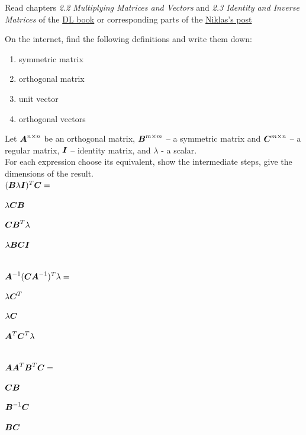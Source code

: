\begin{exercise}

Read chapters \textit{2.2 Multiplying Matrices and Vectors} and \textit{2.3 Identity and Inverse Matrices} of the \href{https://www.deeplearningbook.org/contents/linear_algebra.html}{DL book} or corresponding parts of the \href{https://towardsdatascience.com/linear-algebra-for-deep-learning-f21d7e7d7f23}{Niklas's post}

On the internet, find the following definitions and write them down:
\begin{enumerate}
    \item symmetric matrix
    \item orthogonal matrix
    \item unit vector
    \item orthogonal vectors
\end{enumerate}

Let $\boldsymbol{A}^{n \times n}$ be an orthogonal matrix, $\boldsymbol{B}^{m \times m}$ -- a symmetric matrix and $\boldsymbol{C}^{m \times n}$ -- a regular matrix, $\boldsymbol{I}$ -- identity matrix, and $\lambda$ - a scalar. \\
    For each expression choose its equivalent, show the intermediate steps, give the dimensions of the result. \vspace*{0.5em} \\
    $(\boldsymbol{B} \lambda \boldsymbol{I})^T\boldsymbol{C} = $ \\
    \begin{enumerate*}
        \item $\lambda \boldsymbol{CB}$ \hspace*{3em}
        \item $\boldsymbol{CB}^T  \lambda$ \hspace*{3em}
        \item $\lambda \boldsymbol{BCI}$
    \end{enumerate*}
    \vspace*{0.5em} \\
    $\boldsymbol{A}^{-1}(\boldsymbol{CA}^{-1})^T \lambda = $ \\
    \begin{enumerate*}
        \item $\lambda \boldsymbol{C}^T$ \hspace*{3em}
        \item $\lambda \boldsymbol{C}$ \hspace*{4.5em}
        \item $\boldsymbol{A}^T\boldsymbol{C}^T \lambda$
    \end{enumerate*}
    \vspace*{0.5em} \\
    $\boldsymbol{AA}^T\boldsymbol{B}^T\boldsymbol{C} = $ \\
    \begin{enumerate*}
        \item $\boldsymbol{CB}$ \hspace*{3.2em}
        \item $\boldsymbol{B}^{-1}\boldsymbol{C}$ \hspace*{3.8em}
        \item $\boldsymbol{BC}$
    \end{enumerate*}
    


\end{exercise}
